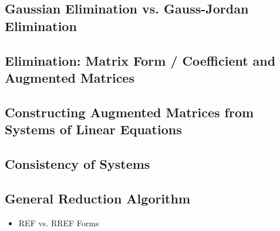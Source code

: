 \documentclass[11pt]{article}
\begin{document}
\subsection{Gaussian Elimination vs. Gauss-Jordan Elimination}
\subsection{Elimination: Matrix Form / Coefficient and Augmented Matrices}
\subsection{Constructing Augmented Matrices from Systems of Linear Equations}
\subsection{Consistency of Systems}
\subsection{General Reduction Algorithm}
\begin{itemize}
    \item REF vs. RREF Forms
\end{itemize}
\end{document}
